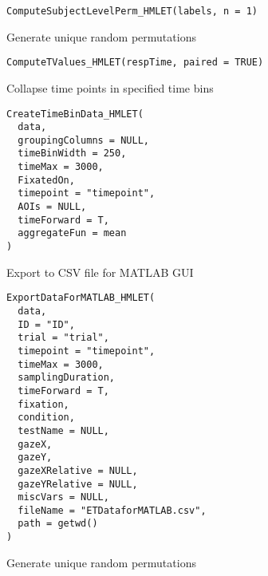 \documentclass[a4paper]{book}
\begin{document}
%
\begin{Usage}
\begin{verbatim}
ComputeSubjectLevelPerm_HMLET(labels, n = 1)
\end{verbatim}
\end{Usage}
%
\begin{Description}\relax
Generate unique random permutations
\end{Description}
%
\begin{Usage}
\begin{verbatim}
ComputeTValues_HMLET(respTime, paired = TRUE)
\end{verbatim}
\end{Usage}
%
\begin{Description}\relax
Collapse time points in specified time bins
\end{Description}
%
\begin{Usage}
\begin{verbatim}
CreateTimeBinData_HMLET(
  data,
  groupingColumns = NULL,
  timeBinWidth = 250,
  timeMax = 3000,
  FixatedOn,
  timepoint = "timepoint",
  AOIs = NULL,
  timeForward = T,
  aggregateFun = mean
)
\end{verbatim}
\end{Usage}
%
\begin{Description}\relax
Export to CSV file for MATLAB GUI
\end{Description}
%
\begin{Usage}
\begin{verbatim}
ExportDataForMATLAB_HMLET(
  data,
  ID = "ID",
  trial = "trial",
  timepoint = "timepoint",
  timeMax = 3000,
  samplingDuration,
  timeForward = T,
  fixation,
  condition,
  testName = NULL,
  gazeX,
  gazeY,
  gazeXRelative = NULL,
  gazeYRelative = NULL,
  miscVars = NULL,
  fileName = "ETDataforMATLAB.csv",
  path = getwd()
)
\end{verbatim}
\end{Usage}
%
\begin{Description}\relax
Generate unique random permutations
\end{Description}
\end{document}

